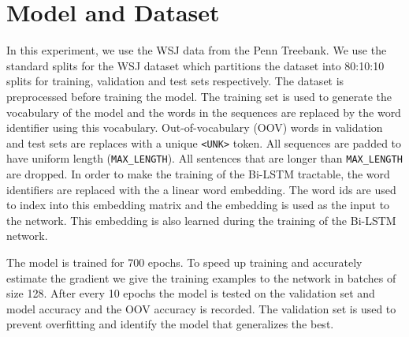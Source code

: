 \documentclass[11pt,letterpaper]{article}
\newcommand{\code}[1]{\texttt{#1}}
\begin{document}
\section{Model and Dataset}
In this experiment, we use the WSJ data from the Penn Treebank. We use the standard splits for the WSJ dataset which partitions the dataset into 80:10:10 splits for training, validation and test sets respectively. The dataset is preprocessed before training the model. The training set is used to generate the vocabulary of the model and the words in the sequences are replaced by the word identifier using this vocabulary. Out-of-vocabulary (OOV) words in validation and test sets are replaces with a unique \code{<UNK>} token. All sequences are padded to have uniform length (\code{MAX\_LENGTH}). All sentences that are longer than \code{MAX\_LENGTH} are dropped. In order to make the training of the Bi-LSTM tractable, the word identifiers are replaced with the a linear word embedding. The word ids are used to index into this embedding matrix and the embedding is used as the input to the network. This embedding is also learned during the training of the Bi-LSTM network.

The model is trained for 700 epochs. To speed up training and accurately estimate the gradient we give the training examples to the network in batches of size 128. After every 10 epochs the model is tested on the validation set and model accuracy and the OOV accuracy is recorded. The validation set is used to prevent overfitting and identify the model that generalizes the best.
\end{document}
